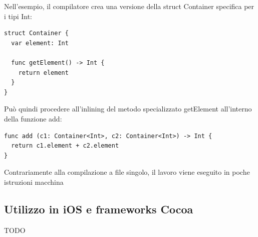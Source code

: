 Nell'esempio, il compilatore crea una versione della struct Container specifica per i tipi Int: 
\begin{lstlisting}
struct Container {
  var element: Int

  func getElement() -> Int {
    return element
  }
}
\end{lstlisting}
Può quindi procedere all'inlining del metodo specializzato getElement all'interno della funzione add:
\begin{lstlisting}
func add (c1: Container<Int>, c2: Container<Int>) -> Int {
  return c1.element + c2.element
}
\end{lstlisting}
Contrariamente alla compilazione a file singolo, il lavoro viene eseguito in poche istruzioni macchina
\subsection{Utilizzo in iOS e frameworks Cocoa}
TODO
